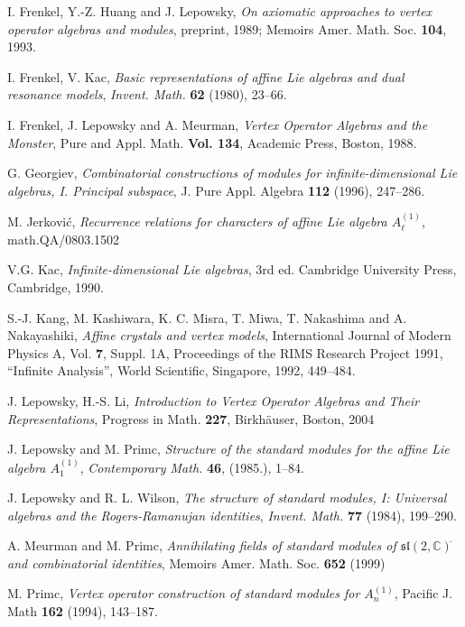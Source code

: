 \documentclass[a4paper, 10pt,oneside]{amsart}
\begin{document}
\begin{thebibliography}{DLinM}
I. Frenkel, Y.-Z. Huang and J. Lepowsky,
\textit{On axiomatic approaches to
vertex operator algebras and modules}, preprint, 1989; Memoirs Amer.
Math. Soc. {\bf 104}, 1993.

I. Frenkel, V. Kac,
\textit{Basic representations of affine Lie algebras and
dual resonance models}, {\em Invent. Math.} {\bf 62} (1980), 23--66.

I. Frenkel, J. Lepowsky and A. Meurman,
{\it Vertex Operator
Algebras and the Monster}, Pure and Appl. Math. {\bf Vol. 134},
Academic Press, Boston, 1988.

 G. Georgiev,
\textit{Combinatorial constructions of modules for
infinite-dimensional Lie algebras, I. Principal subspace},  J. Pure
Appl. Algebra \textbf{112} (1996), 247--286.

 M. Jerkovi\'c,
\textit{Recurrence relations for characters of affine Lie algebra $A_{\ell}^{(1)}$}, 
math.QA/0803.1502

V.G. Kac,
\textit{Infinite-dimensional Lie algebras}, 3rd ed. Cambridge
University Press, Cambridge, 1990.

 S.-J. Kang, M. Kashiwara, K. C. Misra, T. Miwa,
T. Nakashima and A. Nakayashiki,
\textit{Affine crystals and vertex
models}, International Journal of Modern Physics A, Vol. {\bf 7}, Suppl.
1A,
 Proceedings of the RIMS Research Project 1991, ``Infinite Analysis'',
  World Scientific, Singapore, 1992, 449--484.

 J. Lepowsky, H.-S. Li,
\textit{ Introduction to Vertex Operator Algebras
and Their Representations}, Progress in Math. {\bf 227},
Birkh\"auser, Boston, 2004

J. Lepowsky and M. Primc,
\textit{Structure of the standard modules for
the affine Lie algebra $A_{1}^{(1)}$}, {\em Contemporary Math.}
{\bf 46}, (1985.), 1--84.

J. Lepowsky and R. L. Wilson,
\textit{The structure of standard modules,
I: Universal algebras and the Rogers-Ramanujan identities}, {\em
Invent. Math.} {\bf 77} (1984), 199--290.

 A. Meurman and M. Primc, \textit{Annihilating fields of standard modules of $\mathfrak{sl}(2,\mathbb{C})^{\widetilde{} }$ and combinatorial identities}, Memoirs Amer. Math. Soc. {\bf 652} (1999)

 M. Primc, \textit{ Vertex operator construction of standard modules
for $A_n^{(1)}$}, Pacific J. Math {\bf 162} (1994), 143--187.


\end{thebibliography}
\end{document}
